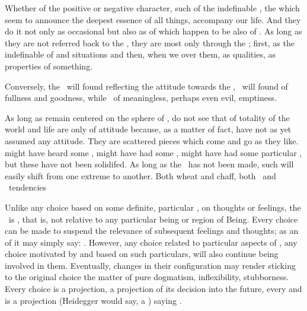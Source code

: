 \pa Whether of the positive or negative character, such
 of the indefinable , the
 which seem to announce the deepest essence of all
things, accompany our life.  And they do it not only as occasional
 but also as  of 
which happen to be also  of .  As
long as they are not referred back to the  ,
they are most  only through the \hoa; first,
as the indefinable  of  and situations and then,
when we  over them, as qualities, as properties of
something.  

\pa 
Conversely, the \sch\ will found 
reflecting the attitude towards the , \yes\ will found
 of fullness and goodness, while \No\ of
meaningless, perhaps even evil, emptiness.

As long as  remain centered on the sphere of ,
 do not see that  of totality of the world and
life are only  of  attitude because, as a matter
of fact,  have not as yet assumed any attitude.  They are
scattered pieces which come and go as they like.   might have
heard some  , might have had some , might have had some particular , but
these have not been solidifed.  As long as the \sch\ has not been
made, such  will easily shift from one extreme to
another.  
%
Both wheat and chaff, both \yes\ and \No\ tendencies


\pa Unlike any choice based on some definite, particular
, on thoughts or feelings, the \sch\ is ,
that is, not relative to any particular being or region of Being. 
Every choice can be made to suspend the relevance of subsequent
feelings and thoughts; as an  of  it may simply
say: .  However, any
choice related to particular aspects of , any choice
motivated by and based on such particulars, will also continue being
involved in them.  Eventually, changes in their configuration may
render sticking to the original choice the matter of pure dogmatism,
inflexibility, stubborness. Every choice is a projection, a projection 
of its  decision into the future, every  and 
 is a projection (Heidegger would say, a ) 
saying .

